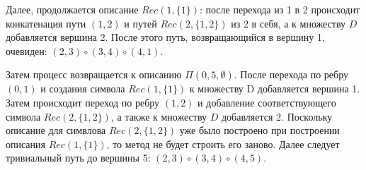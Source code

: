 Далее, продолжается описание $Rec(1,\{1\})$: после перехода из 1 в 2 происходит конкатенация пути $(1,2)$ и путей $Rec(2,\{1,2\})$ из 2 в себя, а к множеству $D$ добавляется вершина 2.
После этого путь, возвращающийся в вершину 1, очевиден: $(2,3) \circ (3,4) \circ (4,1)$.

Затем процесс возвращается к описанию $\Pi(0,5,\emptyset)$. После перехода по ребру $(0,1)$ и создания символа $Rec(1,\{1\})$ к множеству D добавляется вершина 1.
Затем происходит переход по ребру $(1,2)$ и добавление соответствующего символа $Rec(2,\{1,2\})$, а также к множеству $D$ добавляется 2. 
Поскольку описание для симвлова $Rec(2,\{1,2\})$ уже было построено при построении описания $Rec(1,\{1\})$, то метод не будет строить его заново. 
Далее следует тривиальный путь до вершины 5: $(2,3) \circ (3,4) \circ (4,5)$.
\endgroup


